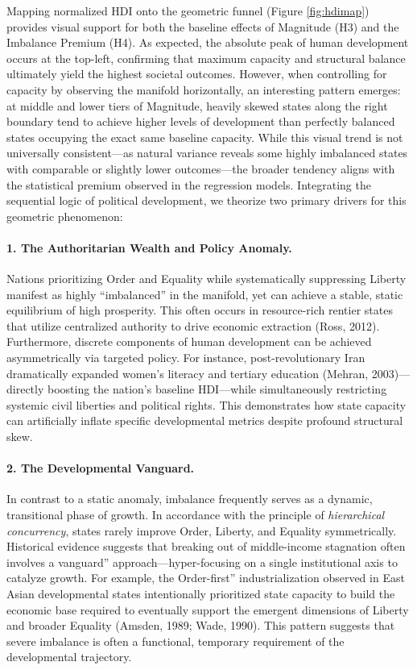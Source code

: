 \documentclass[12pt]{article}
\begin{document}
Mapping normalized HDI onto the geometric funnel (Figure \ref{fig:hdimap}) provides visual support for both the baseline effects of Magnitude (H3) and the Imbalance Premium (H4). As expected, the absolute peak of human development occurs at the top-left, confirming that maximum capacity and structural balance ultimately yield the highest societal outcomes. However, when controlling for capacity by observing the manifold horizontally, an interesting pattern emerges: at middle and lower tiers of Magnitude, heavily skewed states along the right boundary tend to achieve higher levels of development than perfectly balanced states occupying the exact same baseline capacity. While this visual trend is not universally consistent—as natural variance reveals some highly imbalanced states with comparable or slightly lower outcomes—the broader tendency aligns with the statistical premium observed in the regression models. Integrating the sequential logic of political development, we theorize two primary drivers for this geometric phenomenon:

\paragraph{1. The Authoritarian Wealth and Policy Anomaly.}
Nations prioritizing Order and Equality while systematically suppressing Liberty manifest as highly ``imbalanced'' in the manifold, yet can achieve a stable, static equilibrium of high prosperity. This often occurs in resource-rich rentier states that utilize centralized authority to drive economic extraction (Ross, 2012). Furthermore, discrete components of human development can be achieved asymmetrically via targeted policy. For instance, post-revolutionary Iran dramatically expanded women's literacy and tertiary education (Mehran, 2003)—directly boosting the nation's baseline HDI—while simultaneously restricting systemic civil liberties and political rights. This demonstrates how state capacity can artificially inflate specific developmental metrics despite profound structural skew.

\paragraph{2. The Developmental Vanguard.}
In contrast to a static anomaly, imbalance frequently serves as a dynamic, transitional phase of growth. In accordance with the principle of \textit{hierarchical concurrency}, states rarely improve Order, Liberty, and Equality symmetrically. Historical evidence suggests that breaking out of middle-income stagnation often involves a vanguard'' approach—hyper-focusing on a single institutional axis to catalyze growth. For example, the Order-first'' industrialization observed in East Asian developmental states intentionally prioritized state capacity to build the economic base required to eventually support the emergent dimensions of Liberty and broader Equality (Amsden, 1989; Wade, 1990). This pattern suggests that severe imbalance is often a functional, temporary requirement of the developmental trajectory.
\end{document}
